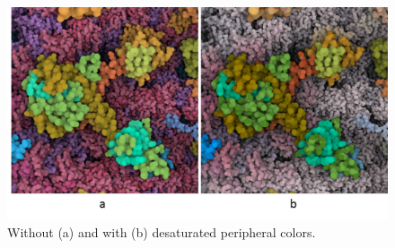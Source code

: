 \documentclass{egpubl}
\begin{document}
	
	
	
	
		
		
		\begin{figure}[t]
			\centering	
			\includegraphics[width=0.9\linewidth]{Figures/desaturated}
			\caption{Without (a) and with (b) desaturated peripheral colors.}
			\label{fig:results_3}
		\end{figure}
	
\end{document}
